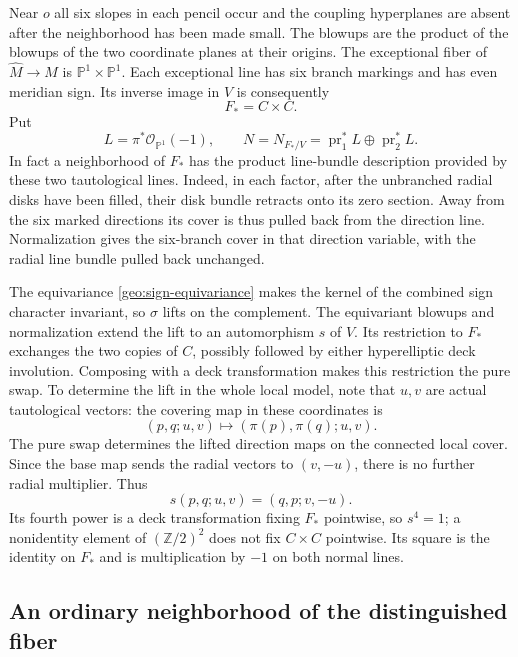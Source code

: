 \documentclass[11pt,reqno]{amsart}
\numberwithin{equation}{section}
\theoremstyle{definition}
\theoremstyle{remark}
\begin{document}
Near $o$ all six slopes in each pencil occur and the coupling
hyperplanes are absent after the neighborhood has been made small.
The blowups are the product of the blowups of the two coordinate
planes at their origins.  The exceptional fiber of $\widehat M\to M$
is $\mathbb P^1\times\mathbb P^1$.  Each exceptional line has six branch markings
and has even meridian sign.  Its inverse image in $V$ is consequently
\begin{equation}\label{geo:Fstar}
                            F_*=C\times C.
\end{equation}
Put
\[
       L=\pi^*\mathcal O_{\mathbb P^1}(-1),
       \qquad N=N_{F_*/V}
          =\operatorname{pr}_1^*L\oplus\operatorname{pr}_2^*L.
\]
In fact a neighborhood of $F_*$ has the product line-bundle description
provided by these two tautological lines.  Indeed, in each factor, after
the unbranched radial disks have been filled, their disk bundle retracts onto its
zero section.  Away from the six marked directions its cover is thus
pulled back from the direction line.  Normalization gives the
six-branch cover in that direction variable, with the radial line
bundle pulled back unchanged.

The equivariance \eqref{geo:sign-equivariance} makes the kernel of the
combined sign character invariant, so $\sigma$ lifts on the complement.
The equivariant blowups and normalization extend the lift to an
automorphism $s$ of $V$.  Its restriction to $F_*$ exchanges the two
copies of $C$, possibly followed by either hyperelliptic deck
involution.  Composing with a deck transformation makes this
restriction the pure swap.  To determine the lift in the whole local
model, note that $u,v$ are actual tautological vectors: the covering
map in these coordinates is
\[
 (p,q;u,v)\longmapsto(\pi(p),\pi(q);u,v).
\]
The pure swap determines the lifted direction maps on the connected
local cover.  Since the base map sends the radial vectors to $(v,-u)$,
there is no further radial multiplier.  Thus
\begin{equation}\label{geo:line-action}
             s(p,q;u,v)=(q,p;v,-u).
\end{equation}
Its fourth power is a deck transformation fixing $F_*$ pointwise,
so $s^4=1$; a nonidentity element of $(\mathbb Z/2)^2$ does not fix $C\times C$
pointwise.  Its square is the identity on $F_*$ and is multiplication
by $-1$ on both normal lines.

\subsection{An ordinary neighborhood of the distinguished fiber}
\label{geo:resolution}
\end{document}
